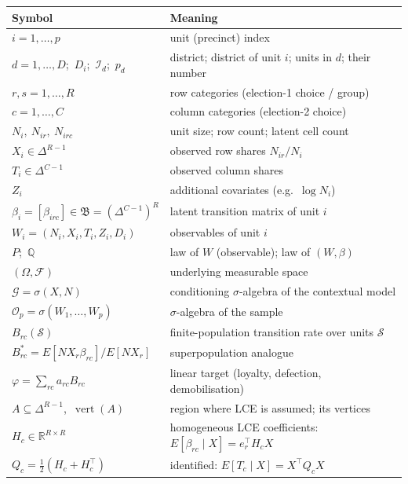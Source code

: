 \begin{table}[ht]
\centering\small
\begin{tabular}{@{}ll@{}}
\toprule
Symbol & Meaning \\
\midrule
$i=1,\dots,p$ & unit (precinct) index \\
$d=1,\dots,D$;\ $D_i$;\ $\mathcal I_d$;\ $p_d$ & district; district of unit $i$; units in $d$; their number \\
$r,s=1,\dots,R$ & row categories (election-1 choice / group) \\
$c=1,\dots,C$ & column categories (election-2 choice) \\
$N_i,\ N_{ir},\ N_{irc}$ & unit size; row count; latent cell count \\
$X_i\in\Delta^{R-1}$ & observed row shares $N_{ir}/N_i$ \\
$T_i\in\Delta^{C-1}$ & observed column shares \\
$Z_i$ & additional covariates (e.g.\ $\log N_i$) \\
$\beta_i=[\beta_{irc}]\in\mathfrak B=(\Delta^{C-1})^R$ & latent transition matrix of unit $i$ \\
$W_i=(N_i,X_i,T_i,Z_i,D_i)$ & observables of unit $i$ \\
$P$;\ $\mathbb Q$ & law of $W$ (observable); law of $(W,\beta)$ \\
$(\Omega,\mathcal F)$ & underlying measurable space \\
$\mathcal G=\sigma(X,N)$ & conditioning $\sigma$-algebra of the contextual model \\
$\mathcal O_p=\sigma(W_1,\dots,W_p)$ & $\sigma$-algebra of the sample \\
$B_{rc}(\mathcal S)$ & finite-population transition rate over units $\mathcal S$ \\
$B^*_{rc}=E[NX_r\beta_{rc}]/E[NX_r]$ & superpopulation analogue \\
$\varphi=\sum_{rc}a_{rc}B_{rc}$ & linear target (loyalty, defection, demobilisation) \\
$A\subseteq\Delta^{R-1}$,\ $\operatorname{vert}(A)$ & region where LCE is assumed; its vertices \\
$H_c\in\mathbb R^{R\times R}$ & homogeneous LCE coefficients: $E[\beta_{rc}\mid X]=e_r^\top H_cX$ \\
$Q_c=\tfrac12(H_c+H_c^\top)$ & identified: $E[T_c\mid X]=X^\top Q_cX$ \\

\end{tabular}
\end{table}
